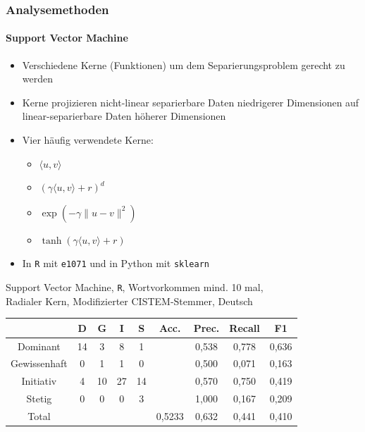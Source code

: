 \begin{frame}
\frametitle{Analysemethoden}
\framesubtitle{Support Vector Machine}
\begin{itemize}\setlength\parskip{12pt}
	\item Verschiedene Kerne (Funktionen) um dem Separierungsproblem gerecht zu werden
	\item Kerne projizieren nicht-linear separierbare Daten niedrigerer Dimensionen auf linear-separierbare Daten höherer Dimensionen
	\item Vier häufig verwendete Kerne:
	\begin{itemize}
		\item {} $\langle u, v \rangle$
		\item {} $(\gamma \langle u, v \rangle + r)^d$
		\item {} $\exp(-\gamma \| u-v \|^2)$
		\item {} $\tanh(\gamma \langle u,v \rangle + r)$
	\end{itemize}
	\item In \texttt{R} mit \texttt{e1071} und in Python mit \texttt{sklearn}
\end{itemize}
\end{frame}
\begin{frame}
\begin{center}
Support Vector Machine, \texttt{R}, Wortvorkommen mind. 10 mal,\\
Radialer Kern, Modifizierter CISTEM-Stemmer, Deutsch

\bigskip

\begin{tabular}{|c|c|c|c|c|c|c|c|c|}
\hline
				& D 	& G	& I & S	& Acc.	& Prec. & Recall	& F1\\
\hline
Dominant 		& 14		& 3 			& 8 		& 1 		&       	& 0,538 	& 0,778 	& 0,636\\
Gewissenhaft 	& 0 		& 1 			& 1 		& 0 		& 			& 0,500 	& 0,071 	& 0,163\\
Initiativ 		& 4 		& 10			& 27		& 14		& 			& 0,570		& 0,750 	& 0,419\\
Stetig 			& 0 		& 0 			& 0 		& 3 		& 			& 1,000	   	& 0,167 	& 0,209\\
\hline
Total 			& 			& 				& 			& 			& 0,5233	& 0,632		& 0,441  	& 0,410\\
\hline
\end{tabular}
\end{center}
\end{frame}
